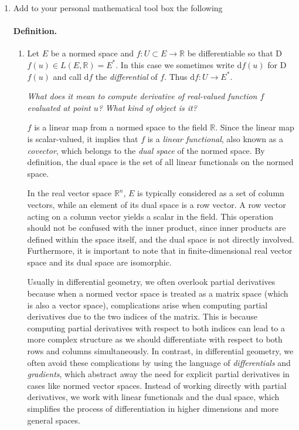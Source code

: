 \documentclass{article}
\begin{document}
\begin{enumerate}[start=9]
  \item Add to your personal mathematical tool box the following
  \paragraph{Definition.}

  \begin{enumerate}
    \item Let $E$ be a normed space and $f:U\subset E\rightarrow\mathbb{R}$ be differentiable so that D$f(u)\in L(E,\mathbb{R})=E^{*}$. In this case we sometimes write d$f(u)$ for D$f(u)$ and call d$f$ the \textit{differential} of $f$. Thus $\text{d}f:U\rightarrow E^{*}$.

    \begin{ans_box}
      \textit{What does it mean to compute derivative of real-valued function $f$ evaluated at point $u$? What kind of object is it?}\medskip

      $f$ is a linear map from a normed space to the field $\mathbb{R}$. Since the linear map is scalar-valued, it implies that $f$ is a \textit{linear functional}, also known as a \textit{covector}, which belongs to the \textit{dual space} of the normed space. By definition, the dual space is the set of all linear functionals on the normed space.\medskip

      In the real vector space $\mathbb{R}^{n}$, $E$ is typically considered as a set of column vectors, while an element of its dual space is a row vector. A row vector acting on a column vector yields a scalar in the field. This operation should not be confused with the inner product, since inner products are defined within the space itself, and the dual space is not directly involved. Furthermore, it is important to note that in finite-dimensional real vector space and its dual space are isomorphic.\medskip

      Usually in differential geometry, we often overlook partial derivatives because when a normed vector space is treated as a matrix space (which is also a vector space), complications arise when computing partial derivatives due to the two indices of the matrix. This is because computing partial derivatives with respect to both indices can lead to a more complex structure as we should differentiate with respect to both rows and columns simultaneously.  In contrast, in differential geometry, we often avoid these complications by using the language of \textit{differentials} and \textit{gradients}, which abstract away the need for explicit partial derivatives in cases like normed vector spaces. Instead of working directly with partial derivatives, we work with linear functionals and the dual space, which simplifies the process of differentiation in higher dimensions and more general spaces.\medskip


\end{ans_box}
\end{enumerate}
\end{enumerate}
\end{document}
